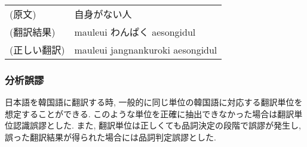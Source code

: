 \begin{tabular}{ll}
 (原文)& 自身がない人 \\
 (翻訳結果) &  mauleui わんぱく aesongidul \\
 (正しい翻訳)& mauleui jangnankuroki aesongidul\\
\end{tabular}

\raggedbottom

\subsubsection{分析誤謬}
日本語を韓国語に翻訳する時, 一般的に同じ単位の韓国語に対応する翻訳単位を想定することができる. このような単位を正確に抽出できなかった場合は翻訳単位認識誤謬とした. また, 翻訳単位は正しくても品詞決定の段階で誤謬が発生し, 誤った翻訳結果が得られた場合には品詞判定誤謬とした. 
\vspace{0.3cm}

